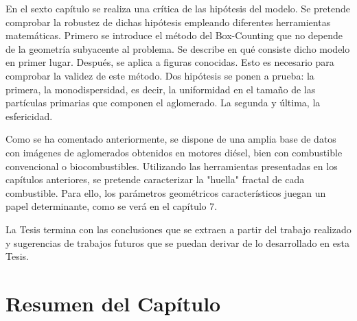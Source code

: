 \par En el sexto capítulo se realiza una crítica de las hipótesis del modelo. Se pretende comprobar la robustez de dichas hipótesis empleando diferentes herramientas matemáticas. Primero se introduce el método del Box-Counting que no depende de la geometría subyacente al problema. Se describe en qué consiste dicho modelo en primer lugar. Después, se aplica a figuras conocidas. Esto es necesario para comprobar la validez de este método. Dos hipótesis se ponen a prueba: la primera, la monodispersidad, es decir, la uniformidad en el tamaño de las partículas primarias que componen el aglomerado. La segunda y última, la esfericidad.

\par Como se ha comentado anteriormente, se dispone de una amplia base de datos con imágenes de aglomerados obtenidos en motores diésel, bien con combustible convencional o biocombustibles. Utilizando las herramientas presentadas en los capítulos anteriores, se pretende caracterizar la "huella" fractal de cada combustible. Para ello, los parámetros geométricos característicos juegan un papel determinante, como se verá en el capítulo 7.

\par La Tesis termina con las conclusiones que se extraen a partir del trabajo realizado y sugerencias de trabajos futuros que se puedan derivar de lo desarrollado en esta Tesis.

\section{Resumen del Capítulo}\label{sec:ResumenCapitulo1}

\newpage
	
